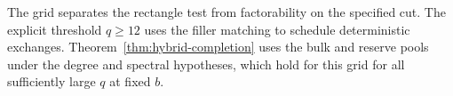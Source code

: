 The grid separates the rectangle test from factorability on the specified cut. The explicit threshold \(q\ge12\) uses the filler matching to schedule deterministic exchanges. Theorem~\ref{thm:hybrid-completion} uses the bulk and reserve pools under the degree and spectral hypotheses, which hold for this grid for all sufficiently large \(q\) at fixed \(b\).
